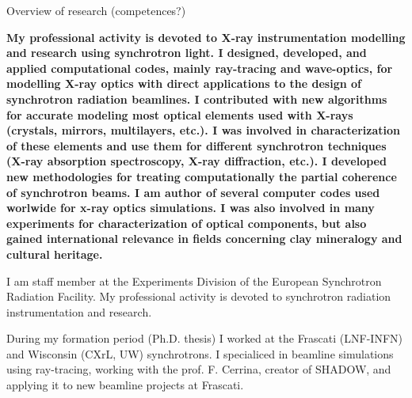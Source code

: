 


\prefix{}
\begin{rubric}{Overview of research (competences?)}

\entry*[]
    \textbf{My professional activity is devoted to X-ray instrumentation modelling and research using synchrotron light. I designed, developed, and applied computational codes, mainly ray-tracing and wave-optics, for modelling X-ray optics with direct applications to the design of synchrotron radiation beamlines.
    I contributed with new algorithms for accurate modeling most optical elements used with X-rays (crystals, mirrors, multilayers, etc.). I was involved in characterization of these elements and use them for different synchrotron techniques (X-ray absorption spectroscopy, X-ray diffraction, etc.). I developed new methodologies for treating computationally the partial coherence of synchrotron beams. I am author of several computer codes used worlwide for x-ray optics simulations. I was also involved in many experiments for characterization of optical components, but also gained international relevance in fields concerning clay mineralogy and cultural heritage.}


\entry*[Details]

I am staff member at the Experiments Division of the European
Synchrotron Radiation Facility. My professional activity is devoted to synchrotron radiation
instrumentation and research.

During my formation period (Ph.D. thesis) I worked at the Frascati (LNF-INFN) and Wisconsin
(CXrL, UW) synchrotrons. I specialiced in beamline simulations using ray-tracing, working with the prof. F. Cerrina, creator of SHADOW, and applying it to new beamline projects at Frascati. 


\end{rubric}

